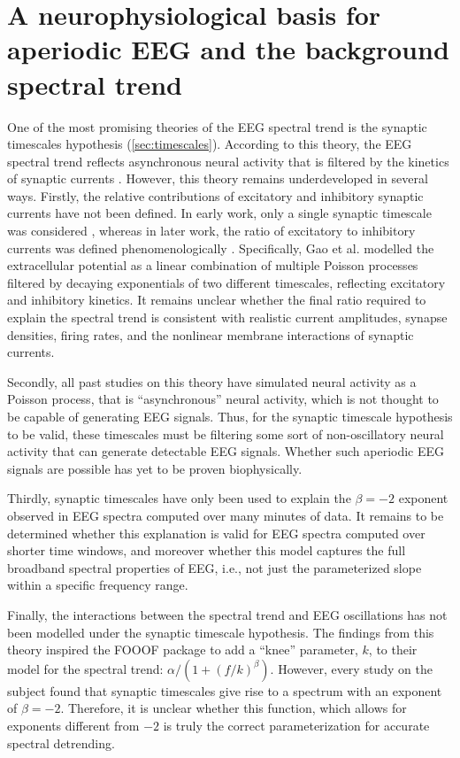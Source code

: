 \chapter{A neurophysiological basis for aperiodic EEG and the background spectral trend} \label{sec:natcomms}

One of the most promising theories of the EEG spectral trend is the synaptic timescales hypothesis (\autoref{sec:timescales}). According to this theory, the EEG spectral trend reflects asynchronous neural activity that is filtered by the kinetics of synaptic currents \cite{Bedard2006,Miller2009, Gao2017}. However, this theory remains underdeveloped in several ways. Firstly, the relative contributions of excitatory and inhibitory synaptic currents have not been defined. In early work, only a single synaptic timescale was considered \cite{Bedard2006,Miller2009}, whereas in later work, the ratio of excitatory to inhibitory currents was defined phenomenologically \cite{Gao2017}. Specifically, Gao et al. \cite{Gao2017} modelled the extracellular potential as a linear combination of multiple Poisson processes filtered by decaying exponentials of two different timescales, reflecting excitatory and inhibitory kinetics. It remains unclear whether the final ratio required to explain the spectral trend is consistent with realistic current amplitudes, synapse densities, firing rates, and the nonlinear membrane interactions of synaptic currents. 

Secondly, all past studies on this theory have simulated neural activity as a Poisson process, that is ``asynchronous'' neural activity, which is not thought to be capable of generating EEG signals. Thus, for the synaptic timescale hypothesis to be valid, these timescales must be filtering some sort of non-oscillatory neural activity that can generate detectable EEG signals. Whether such aperiodic EEG signals are possible has yet to be proven biophysically.

Thirdly, synaptic timescales have only been used to explain the $\beta=-2$ exponent observed in EEG spectra computed over many minutes of data. It remains to be determined whether this explanation is valid for EEG spectra computed over shorter time windows, and moreover whether this model captures the full broadband spectral properties of EEG, i.e., not just the parameterized slope within a specific frequency range. 

Finally, the interactions between the spectral trend and EEG oscillations has not been modelled under the synaptic timescale hypothesis. The findings from this theory inspired the FOOOF package to add a ``knee'' parameter, $k$, to their model for the spectral trend: $\alpha/(1+(f/k)^\beta)$. However, every study on the subject found that synaptic timescales give rise to a spectrum with an exponent of $\beta=-2$. Therefore, it is unclear whether this function, which allows for exponents different from $-2$ is truly the correct parameterization for accurate spectral detrending. 

